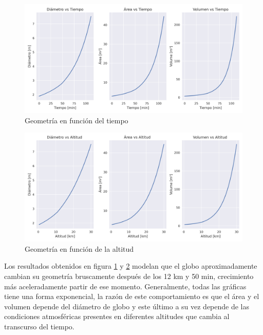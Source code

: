 \begin{figure}[H]
    \centering
    \includegraphics[width=0.9\linewidth]{document/figures/03_geometria_vs_tiempo.png}
    \caption{Geometría en función del tiempo}
    \label{fig:geometria_vs_tiempo}
\end{figure}

\begin{figure}[H]
    \centering
    \includegraphics[width=0.92\linewidth]{document/figures/03_geometria_vs_altitud.png}
    \caption{Geometría en función de la altitud}
    \label{fig:geometria_vs_altitud}
\end{figure}

\newpage

Los resultados obtenidos en figura \ref{fig:geometria_vs_tiempo} y \ref{fig:geometria_vs_altitud}  modelan que el globo aproximadamente cambian su geometría bruscamente  después de los 12 km y 50 min, crecimiento más aceleradamente partir de ese momento. Generalmente, todas las gráficas tiene una forma exponencial, la razón de este comportamiento es que el área y el volumen depende del diámetro de globo y este último a su vez depende de las condiciones atmosféricas presentes en diferentes altitudes que cambia al transcurso del tiempo.

